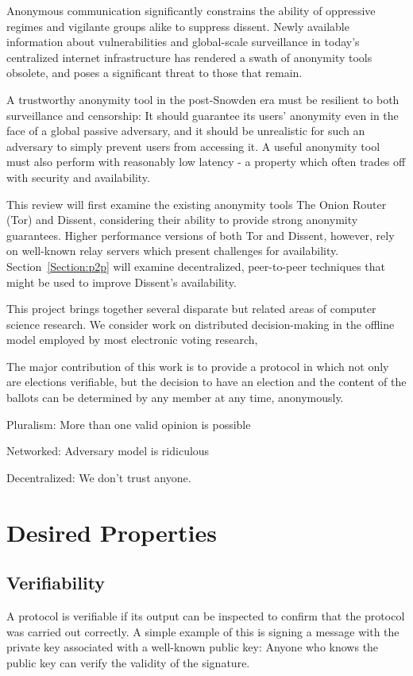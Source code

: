 Anonymous communication significantly constrains the ability of oppressive
regimes and vigilante groups alike to suppress dissent. Newly available
information about vulnerabilities and global-scale surveillance in today's
centralized internet infrastructure has rendered a swath of anonymity tools
obsolete, and poses a significant threat to those that remain.

A trustworthy anonymity tool in the post-Snowden era must be resilient to both
surveillance and censorship: It should guarantee its users' anonymity even in
the face of a global passive adversary, and it should be unrealistic for such an
adversary to simply prevent users from accessing it. A useful anonymity tool
must also perform with reasonably low latency - a property which often trades
off with security and availability.

This review will first examine the existing anonymity tools The Onion Router
(Tor) and Dissent, considering their ability to provide strong anonymity
guarantees. Higher performance versions of both Tor and Dissent, however, rely
on well-known relay servers which present challenges for availability.
Section~\ref{Section:p2p} will examine decentralized, peer-to-peer techniques
that might be used to improve Dissent's availability.

This project brings together several disparate but related areas of computer
science research. We consider work on distributed decision-making in the offline
model employed by most electronic voting research,

The major contribution of this work is to provide a protocol in which not only
are elections verifiable, but the decision to have an election and the content
of the ballots can be determined by any member at any time,
anonymously.

Pluralism: More than one valid opinion is possible

Networked: Adversary model is ridiculous

Decentralized: We don't trust anyone.

\section{Desired Properties}
  \subsection{Verifiability}\label{Subsection:verif}
  A protocol is verifiable if its output can be inspected to confirm that the
  protocol was carried out correctly. A simple example of this is signing a
  message with the private key associated with a well-known public key: Anyone
  who knows the public key can verify the validity of the signature.

